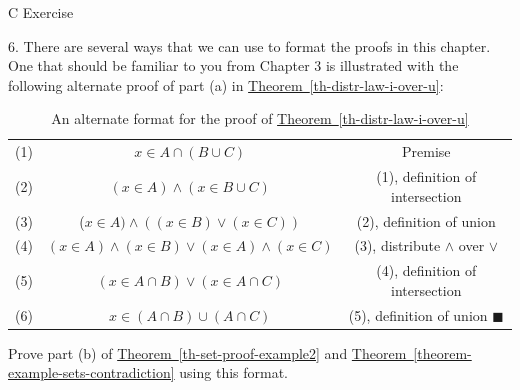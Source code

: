 \documentclass[10pt,]{book}
\theoremstyle{plain}
\theoremstyle{definition}
\theoremstyle{definition}
\theoremstyle{definition}
\begin{document}
\par\smallskip\noindent
\hypertarget{exercisegroup-4}{}\typeout{************************************************}
\typeout{************************************************}
C Exercise%
\begin{exercisegroup}
\item[6.]\hypertarget{exercise-11}{} There are several ways that we can use to format the proofs in this chapter. One that should be familiar to you from Chapter 3 is illustrated with the following alternate proof of part (a) in \hyperref[th-distr-law-i-over-u]{Theorem~\ref{th-distr-law-i-over-u}}:%
\leavevmode%
\begin{table}
\centering
\begin{tabular}{ccc}
(1) &\(x \in  A \cap  (B \cup  C)\)  & Premise\tabularnewline[0pt]
(2) &\((x \in  A) \land  (x \in  B \cup  C)\) & (1), definition of intersection \tabularnewline[0pt]
(3)&  (\(x \in  A) \land ((x \in  B) \lor  (x \in  C))\) &(2), definition of union  \tabularnewline[0pt]
(4)& \((x \in A)\land (x\in  B)\lor  (x \in A)\land (x\in  C)\) & (3), distribute \(\land\) over \(\lor\) \tabularnewline[0pt]
(5)& \((x \in  A\cap B) \lor (x \in  A \cap C)\) & (4), definition of intersection \tabularnewline[0pt]
(6)&  \(x \in  (A \cap B) \cup  (A \cap C)\) & (5), definition of union \(\blacksquare\) 
\end{tabular}
\caption{An alternate format for the proof of \hyperref[th-distr-law-i-over-u]{Theorem~\ref{th-distr-law-i-over-u}}\label{tt-conditional-proof}}
\end{table}
\par
Prove part (b) of \hyperref[th-set-proof-example2]{Theorem~\ref{th-set-proof-example2}} and \hyperref[theorem-example-sets-contradiction]{Theorem~\ref{theorem-example-sets-contradiction}} using this format.%
\par\smallskip
\end{exercisegroup}
\par\smallskip\noindent
\typeout{************************************************}
\typeout{************************************************}
\end{document}
